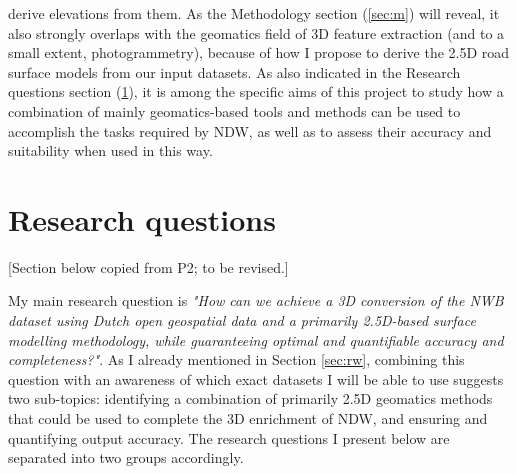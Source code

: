 derive elevations from them. As the Methodology section (\ref{sec:m}) will reveal, it also strongly overlaps with the geomatics field of 3D feature extraction (and to a small extent, photogrammetry), because of how I propose to derive the 2.5D road surface models from our input datasets. As also indicated in the Research questions section (\ref{sec:rq}), it is among the specific aims of this project to study how a combination of mainly geomatics-based tools and methods can be used to accomplish the tasks required by NDW, as well as to assess their accuracy and suitability when used in this way.

\section{Research questions}
\label{sec:rq}

[Section below copied from P2; to be revised.]

My main research question is \textit{"How can we achieve a 3D conversion of the NWB dataset using Dutch open geospatial data and a primarily 2.5D-based surface modelling methodology, while guaranteeing optimal and quantifiable accuracy and completeness?"}. As I already mentioned in Section \ref{sec:rw}, combining this question with an awareness of which exact datasets I will be able to use suggests two sub-topics: identifying a combination of primarily 2.5D geomatics methods that could be used to complete the 3D enrichment of NDW, and ensuring and quantifying output accuracy. The research questions I present below are separated into two groups accordingly.

